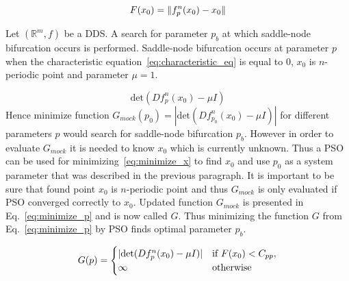 \begin{equation}
\label{eq:minimize_x}
    F(x_0) = \lVert f^{n}_{p}(x_0)-x_0\rVert
\end{equation}

\par
Let $(\mathbb{R}^{m}, f)$ be a DDS.
A search for parameter $p_b$ at which saddle-node bifurcation occurs is performed.
Saddle-node bifurcation occurs at parameter $p$ when the characteristic equation~\ref{eq:characteristic_eq} is equal to $0$, $x_0$ is $n$-periodic point and parameter $\mu = 1$.

\begin{equation}
\label{eq:characteristic_eq}
        \text{det}(Df^{n}_{p}(x_0)-\mu I)
\end{equation}
Hence minimize function $G_{mock}(p_0) = |\text{det}(Df^{n}_{p_0}(x_0)-\mu I)|$ for different parameters $p$ would search for saddle-node bifurcation $p_b$.
However in order to evaluate $G_{mock}$ it is needed to know $x_0$ which is currently unknown.
Thus a PSO can be used for minimizing~\ref{eq:minimize_x} to find $x_0$ and use $p_0$ as a system parameter that was described in the previous paragraph.
It is important to be sure that found point $x_0$ is $n$-periodic point and thus $G_{mock}$ is only evaluated if PSO converged correctly to $x_0$.
Updated function $G_{mock}$ is presented in Eq.~\ref{eq:minimize_p} and is now called $G$.
Thus minimizing the function $G$ from Eq.~\ref{eq:minimize_p} by PSO finds optimal parameter $p_b$.

\begin{equation}
\label{eq:minimize_p}
    G(p) =
    \begin{cases}
        |\text{det}(Df^{n}_{p}(x_0)-\mu I)| & \text{if } F(x_0) < C_{pp}, \\
        \infty & \rm{otherwise}
    \end{cases}
\end{equation}

